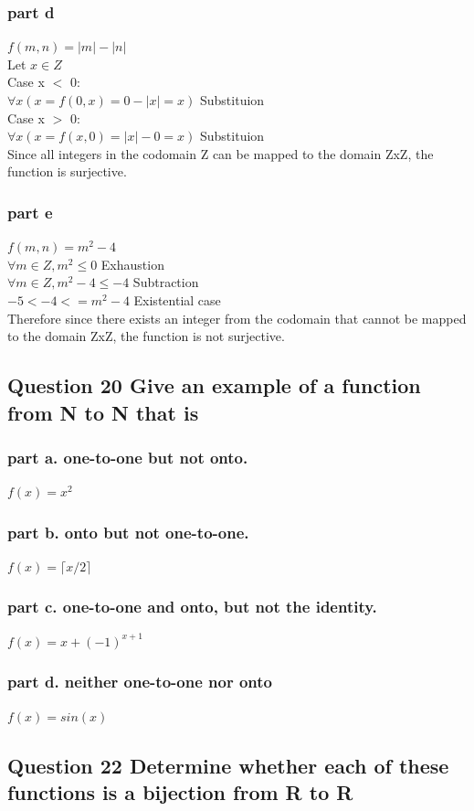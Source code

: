 \documentclass{article}
\begin{document}
\subsubsection{part d}
$f (m, n)= |m|-|n|$\\
Let $x \in Z$\\
Case x $<$ 0: \\
$\forall x (x = f(0,x) = 0 - |x| = x)$ Substituion\\
Case x $>$ 0: \\
$\forall x (x = f(x,0) = |x| - 0 = x)$ Substituion\\
Since all integers in the codomain Z can be mapped to the domain ZxZ, the function is surjective. 
\subsubsection{part e}
$f (m, n)= m^2 - 4$\\
$\forall m \in Z, m^2 \leq 0$ Exhaustion\\
$\forall m \in Z, m^2 -4 \leq -4$ Subtraction\\
$-5 < -4 <= m^2 -4$ Existential case\\
Therefore since there exists an integer from the codomain that cannot be mapped to the domain ZxZ, the function is not surjective.

\subsection{Question 20 Give an example of a function from N to N that is}
\subsubsection{part a. one-to-one but not onto.}
$f(x) = x^2$
\subsubsection{part b. onto but not one-to-one.}
$f(x) = \lceil x/2 \rceil$
\subsubsection{part c. one-to-one and onto, but not the identity.}
$f(x) = x + (-1)^{x+1}$
\subsubsection{part d. neither one-to-one nor onto}
$f(x) = sin(x)$
\subsection{Question 22 Determine whether each of these functions is a bijection
from R to R}
\end{document}
